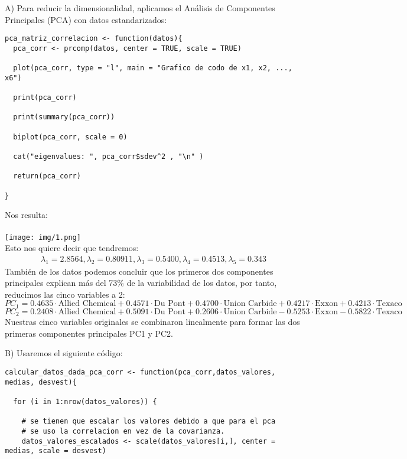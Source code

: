 \begin{sol}A)
Para reducir la dimensionalidad, aplicamos el Análisis de Componentes Principales (PCA) con datos estandarizados:
\begin{verbatim}
pca_matriz_correlacion <- function(datos){
  pca_corr <- prcomp(datos, center = TRUE, scale = TRUE)

  plot(pca_corr, type = "l", main = "Grafico de codo de x1, x2, ..., x6")

  print(pca_corr)

  print(summary(pca_corr))

  biplot(pca_corr, scale = 0)

  cat("eigenvalues: ", pca_corr$sdev^2 , "\n" )

  return(pca_corr)

}
\end{verbatim}
Nos resulta:\\\\
\texttt{[image: img/1.png]}\\
Esto nos quiere decir que tendremos:
\begin{align*}
\lambda_1 = 2.8564, \lambda_2 = 0.80911, \lambda_3 = 0.5400, \lambda_4 = 0.4513 , \lambda_5 = 0.343
\end{align*}
También de los datos podemos concluir que los primeros dos componentes principales explican más del 73\% de la variabilidad de los datos, por tanto, reducimos las cinco variables a 2:
\[
PC_1 = 0.4635 \cdot \text{Allied Chemical} + 0.4571 \cdot \text{Du Pont} + 0.4700 \cdot \text{Union Carbide} + 0.4217 \cdot \text{Exxon} + 0.4213 \cdot \text{Texaco}
\]
\[
PC_2 = 0.2408 \cdot \text{Allied Chemical} + 0.5091 \cdot \text{Du Pont} + 0.2606 \cdot \text{Union Carbide} - 0.5253 \cdot \text{Exxon} - 0.5822 \cdot \text{Texaco}
\]
Nuestras cinco variables originales se combinaron linealmente para formar las dos primeras componentes principales PC1 y PC2.

\pagebreak

B) Usaremos el siguiente código: 
\begin{verbatim}
calcular_datos_dada_pca_corr <- function(pca_corr,datos_valores, medias, desvest){

  for (i in 1:nrow(datos_valores)) {

    # se tienen que escalar los valores debido a que para el pca
    # se uso la correlacion en vez de la covarianza.
    datos_valores_escalados <- scale(datos_valores[i,], center = medias, scale = desvest)


\end{verbatim}
\end{sol}
